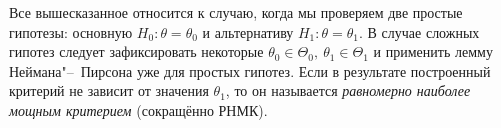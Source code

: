 \begin{rmrk}
    Все вышесказанное относится к случаю, когда мы проверяем две простые гипотезы: основную $H_0\colon \theta = \theta_0$ и альтернативу $H_1\colon \theta = \theta_1$.
    В случае сложных гипотез следует зафиксировать некоторые $\theta_0 \in \Theta_0, \: \theta_1 \in \Theta_1$ и применить лемму Неймана"--~Пирсона уже для простых гипотез.
    Если в результате построенный критерий не зависит от значения $\theta_1$, то он называется \textit{равномерно наиболее мощным критерием} (сокращённо РНМК).
\end{rmrk}
